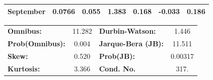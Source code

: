 \documentclass[a4paper,11pt]{article}
\begin{document}
\begin{center}
\begin{tabular}{lcccccc}
\textbf{September}             &       0.0766  &        0.055     &     1.383  &         0.168        &       -0.033    &        0.186     \\
\bottomrule
\end{tabular}
\begin{tabular}{lclc}
\textbf{Omnibus:}       & 11.282 & \textbf{  Durbin-Watson:     } &    1.446  \\
\textbf{Prob(Omnibus):} &  0.004 & \textbf{  Jarque-Bera (JB):  } &   11.511  \\
\textbf{Skew:}          &  0.520 & \textbf{  Prob(JB):          } &  0.00317  \\
\textbf{Kurtosis:}      &  3.366 & \textbf{  Cond. No.          } &     317.  \\
\bottomrule
\end{tabular}
\end{center}
\newpage
\end{document}
